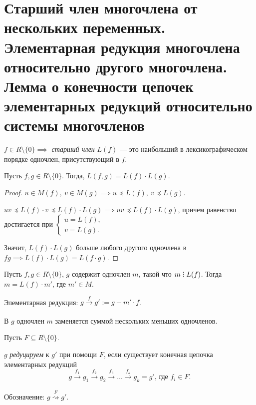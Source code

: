 \section{Старший член многочлена от нескольких переменных. Элементарная редукция многочлена относительно другого многочлена. Лемма о конечности цепочек элементарных редукций относительно системы многочленов}

\begin{definition}
    $f \in R \setminus \{0\} \implies $ \textit{старший член} $L(f)$ --- это наибольший в лексикографическом порядке одночлен, присутствующий в $f$.
\end{definition}

\begin{lemma}
    Пусть $f, g \in R \setminus \{0\}$. Тогда, $L(f, g) = L(f) \cdot L(g)$.
\end{lemma}

\begin{proof}
    $u \in M(f), \ v \in M(g) \implies u \preceq L(f), \ v \preceq L(g)$.

    $uv \preceq L(f) \cdot v \preceq L(f) \cdot L(g) \implies uv \preceq L(f) \cdot L(g)$, причем равенство достигается при
    \begin{math}
        \begin{cases}
            u = L(f),\\
            v = L(g).
        \end{cases}
    \end{math}

    Значит, $L(f) \cdot L(g)$ больше любого другого одночлена в $fg \implies L(f) \cdot L(g) = L(f \cdot g)$.
\end{proof}

Пусть $f, g \in R \setminus \{0\}$, $g$ содержит одночлен $m$, такой что $m \divby L(f)$. Тогда $m = L(f) \cdot m'$, где $m' \in M$.

Элементарная редукция: $g \xrightarrow[]{f} g' := g - m' \cdot f$.

В $g$ одночлен $m$ заменяется суммой нескольких меньших одночленов.

\medskip
Пусть $F \subseteq R \setminus \{0\}$.

\begin{definition}
    $g$ \textit{редуцируем} к $g'$ при помощи $F$, если существует конечная цепочка элементарных редукций
    \begin{equation*}
        g \xrightarrow[]{f_1} g_1 \xrightarrow[]{f_2} g_2 \xrightarrow[]{f_3} \dots \xrightarrow[]{f_k} g_k = g' \text{, где } f_i \in F
    .\end{equation*}

    Обозначение: $g \overset{F}{\rightsquigarrow} g'$.
\end{definition}

